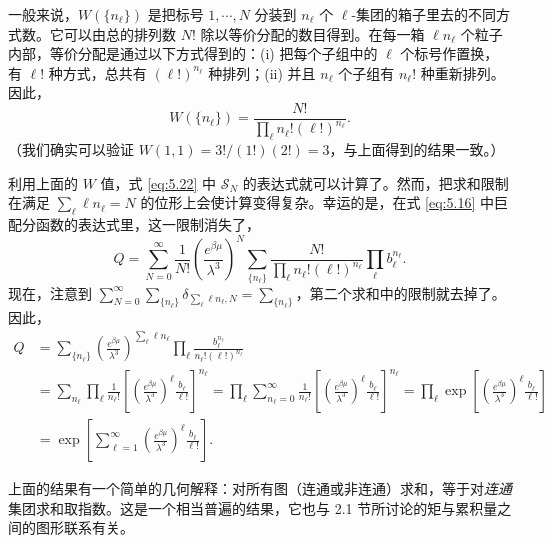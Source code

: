 一般来说，$W(\{n_\ell\})$ 是把标号 $1,\cdots,N$ 分装到 $n_\ell$ 个 $\ell$-集团的箱子里去的不同方式数。它可以由总的排列数 $N!$ 除以等价分配的数目得到。在每一箱 $\ell n_\ell$ 个粒子内部，等价分配是通过以下方式得到的：(i) 把每个子组中的 $\ell$ 个标号作置换，有 $\ell!$ 种方式，总共有 $(\ell!)^{n_\ell}$ 种排列；(ii) 并且 $n_\ell$ 个子组有 $n_\ell!$ 种重新排列。因此，
\begin{equation}\label{eq:5.23}
W(\{n_\ell\})=\frac{N!}{\prod_\ell n_\ell!(\ell!)^{n_\ell}}.
\end{equation}
（我们确实可以验证 $W(1,1)=3!/(1!)(2!)=3$，与上面得到的结果一致。）

利用上面的 $W$ 值，式 \eqref{eq:5.22} 中 $\mathscr S_N$ 的表达式就可以计算了。然而，把求和限制在满足 $\sum_\ell\ell n_\ell=N$ 的位形上会使计算变得复杂。幸运的是，在式 \eqref{eq:5.16} 中巨配分函数的表达式里，这一限制消失了，
\begin{equation}\label{eq:5.24}
Q=\sum_{N=0}^\infty\frac{1}{N!}\left(\frac{e^{\beta\mu}}{\lambda^3}\right)^N\sum_{\{n_\ell\}}\frac{N!}{\prod_\ell n_\ell!(\ell!)^{n_\ell}}\prod_\ell b_\ell^{n_\ell}.
\end{equation}
现在，注意到 $\sum_{N=0}^\infty\sum_{\{n_\ell\}}\delta_{\sum_\ell\ell n_\ell,N}=\sum_{\{n_\ell\}}$，第二个求和中的限制就去掉了。因此，
\begin{equation}\label{eq:5.25}
\begin{aligned}
Q&=\sum_{\{n_\ell\}}\left(\frac{e^{\beta\mu}}{\lambda^3}\right)^{\sum_\ell\ell n_\ell}\prod_\ell\frac{b_\ell^{n_\ell}}{n_\ell!(\ell!)^{n_\ell}}\\
&=\sum_{n_\ell}\prod_\ell\frac{1}{n_\ell!}\left[\left(\frac{e^{\beta\mu}}{\lambda^3}\right)^\ell\frac{b_\ell}{\ell!}\right]^{n_\ell}=\prod_\ell\sum_{n_\ell=0}^\infty\frac{1}{n_\ell!}\left[\left(\frac{e^{\beta\mu}}{\lambda^3}\right)^\ell\frac{b_\ell}{\ell!}\right]^{n_\ell}=\prod_\ell\exp\left[\left(\frac{e^{\beta\mu}}{\lambda^3}\right)^\ell\frac{b_\ell}{\ell!}\right]\\
&=\exp\left[\sum_{\ell=1}^\infty\left(\frac{e^{\beta\mu}}{\lambda^3}\right)^\ell\frac{b_\ell}{\ell!}\right].
\end{aligned}
\end{equation}


上面的结果有一个简单的几何解释：对所有图（连通或非连通）求和，等于对\emph{连通}集团求和取指数。这是一个相当普遍的结果，它也与 2.1 节所讨论的矩与累积量之间的图形联系有关。

